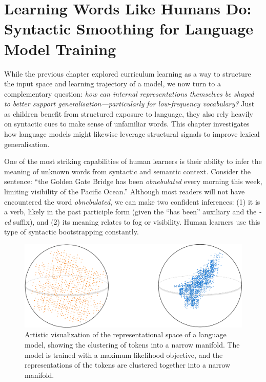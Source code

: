 \chapter{Learning Words Like Humans Do: Syntactic Smoothing for Language Model Training}

While the previous chapter explored curriculum learning as a way to structure the input space and learning trajectory of a model, we now turn to a complementary question: \emph{how can internal representations themselves be shaped to better support generalisation—particularly for low-frequency vocabulary?} Just as children benefit from structured exposure to language, they also rely heavily on syntactic cues to make sense of unfamiliar words. This chapter investigates how language models might likewise leverage structural signals to improve lexical generalisation.

One of the most striking capabilities of human learners is their ability to infer the meaning of unknown words from syntactic and semantic context. Consider the sentence: ``the Golden Gate Bridge has been \emph{obnebulated} every morning this week, limiting visibility of the Pacific Ocean.'' Although most readers will not have encountered the word \textit{obnebulated}, we can make two confident inferences: (1) it is a verb, likely in the past participle form (given the ``has been'' auxiliary and the \textit{-ed} suffix), and (2) its meaning relates to fog or visibility. Human learners use this type of syntactic bootstrapping constantly.

\begin{figure}[ht!]
    \centering
    \includegraphics[width=0.8\linewidth]{chapters/syntatic-smoothing/figures/anisotropy_visualization.pdf}
    \caption{Artistic visualization of the representational space of a language model, showing the clustering of tokens into a narrow manifold. The model is trained with a maximum likelihood objective, and the representations of the tokens are clustered together into a narrow manifold.}
    \label{fig:anisotropy_visualization}
\end{figure}

